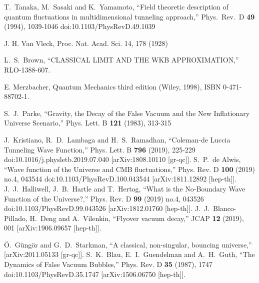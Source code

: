 \documentclass[a4paper,11pt]{article}
\numberwithin{equation}{section}
\begin{document}
\begin{thebibliography}{99}
  

T.~Tanaka, M.~Sasaki and K.~Yamamoto,
``Field theoretic description of quantum fluctuations in multidimensional tunneling approach,''
Phys.\ Rev.\ D \textbf{49} (1994), 1039-1046
doi:10.1103/PhysRevD.49.1039

  
  J. H. Van Vleck, Proc. Nat. Acad. Sci. 14, 178 (1928)
  
  
L.~S.~Brown,
``CLASSICAL LIMIT AND THE WKB APPROXIMATION,''
RLO-1388-607.

  
  E. Merzbacher, Quantum Mechanics third edition (Wiley, 1998), ISBN 0-471-88702-1.

S.~J.~Parke,
``Gravity, the Decay of the False Vacuum and the New Inflationary Universe Scenario,''
Phys. Lett. B \textbf{121} (1983), 313-315

J.~Kristiano, R.~D.~Lambaga and H.~S.~Ramadhan,
``Coleman-de Luccia Tunneling Wave Function,''
Phys. Lett. B \textbf{796} (2019), 225-229
doi:10.1016/j.physletb.2019.07.040
[arXiv:1808.10110 [gr-qc]].
S.~P.~de Alwis,
``Wave function of the Universe and CMB fluctuations,''
Phys. Rev. D \textbf{100} (2019) no.4, 043544
doi:10.1103/PhysRevD.100.043544
[arXiv:1811.12892 [hep-th]].
J.~J.~Halliwell, J.~B.~Hartle and T.~Hertog,
``What is the No-Boundary Wave Function of the Universe?,''
Phys. Rev. D \textbf{99} (2019) no.4, 043526
doi:10.1103/PhysRevD.99.043526
[arXiv:1812.01760 [hep-th]].
J.~J.~Blanco-Pillado, H.~Deng and A.~Vilenkin,
``Flyover vacuum decay,''
JCAP \textbf{12} (2019), 001
[arXiv:1906.09657 [hep-th]].




\"O.~G\"ung\"or and G.~D.~Starkman,
``A classical, non-singular, bouncing universe,''
[arXiv:2011.05133 [gr-qc]].
S.~K.~Blau, E.~I.~Guendelman and A.~H.~Guth,
``The Dynamics of False Vacuum Bubbles,''
Phys. Rev. D \textbf{35} (1987), 1747
doi:10.1103/PhysRevD.35.1747
[arXiv:1506.06750 [hep-th]].
  


\end{thebibliography}
\end{document}
